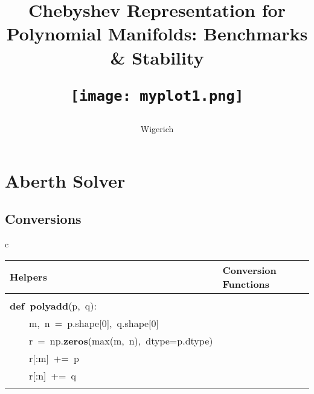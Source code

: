 \documentclass{article}\usepackage[]{graphicx}\usepackage[dvipsnames,table]{xcolor}
\title{
\vskip 5mm
{\bf\huge Chebyshev Representation}
\vskip 5mm
{\bf\huge for}
\vskip 5mm
{\bf\huge Polynomial Manifolds:}
\vskip 5mm
{\bf\huge Benchmarks \& Stability}
\vskip 1cm
\begin{center}
\texttt{[image: myplot1.png]}
\end{center}
\vskip 1cm
}
\author{Wigerich}
\makeatletter
\newcommand{\hlnum}[1]{\textcolor[rgb]{0.686,0.059,0.569}{#1}}%
\newcommand{\hlopt}[1]{\textcolor[rgb]{0,0,0}{#1}}%
\newcommand{\hldef}[1]{\textcolor[rgb]{0.345,0.345,0.345}{#1}}%
\newcommand{\hlkwa}[1]{\textcolor[rgb]{0.161,0.373,0.58}{\textbf{#1}}}%
\newcommand{\hlkwb}[1]{\textcolor[rgb]{0.69,0.353,0.396}{#1}}%
\newcommand{\hlkwd}[1]{\textcolor[rgb]{0.737,0.353,0.396}{\textbf{#1}}}%
\newenvironment{kframe}{%
 \def\at@end@of@kframe{}%
 \ifinner\ifhmode%
  \def\at@end@of@kframe{\end{minipage}}%
  \begin{minipage}{\columnwidth}%
 \fi\fi%
 \def\FrameCommand##1{\hskip\@totalleftmargin \hskip-\fboxsep
 \colorbox{shadecolor}{##1}\hskip-\fboxsep
     \hskip-\linewidth \hskip-\@totalleftmargin \hskip\columnwidth}%
 \MakeFramed {\advance\hsize-\width
   \@totalleftmargin\z@ \linewidth\hsize
   \@setminipage}}%
 {\par\unskip\endMakeFramed%
 \at@end@of@kframe}
\newenvironment{knitrout}{}{} %
\makeatother
\begin{document}
\maketitle

\newpage
\tableofcontents

\newpage
\section{Aberth Solver}
\subsection{Conversions}

\begin{center}
\begin{tabular}{c}
\begin{tabular}{m{10cm}m{10cm}}
\toprule
Helpers & Conversion Functions \\
\midrule
\begin{minipage}[m]{10cm}
\begin{knitrout}\tiny
\definecolor{shadecolor}{rgb}{0.969, 0.969, 0.969}\color{fgcolor}\begin{kframe}
\noindent
\ttfamily
\hldef{}\hlkwb{@njit}\hldef{}\hlopt{(}\hldef{fastmath}\hlopt{=}\hldef{}\hlkwa{True}\hldef{}\hlopt{)}\hspace*{\fill}\\
\hldef{}\hlkwa{def\ }\hldef{}\hlkwd{\textunderscore poly\textunderscore add}\hldef{}\hlopt{(}\hldef{p}\hlopt{,\ }\hldef{q}\hlopt{):}\hspace*{\fill}\\
\hldef{}\hldef{\ \ \ \ }\hldef{m}\hlopt{,\ }\hldef{n\ }\hlopt{=\ }\hldef{p}\hlopt{.}\hldef{shape}\hlopt{{[}}\hldef{}\hlnum{0}\hldef{}\hlopt{{]},\ }\hldef{q}\hlopt{.}\hldef{shape}\hlopt{{[}}\hldef{}\hlnum{0}\hldef{}\hlopt{{]}}\hspace*{\fill}\\
\hldef{}\hldef{\ \ \ \ }\hldef{r\ }\hlopt{=\ }\hldef{np}\hlopt{.}\hldef{}\hlkwd{zeros}\hldef{}\hlopt{(}\hldef{}\hlkwb{max}\hldef{}\hlopt{(}\hldef{m}\hlopt{,\ }\hldef{n}\hlopt{),\ }\hldef{dtype}\hlopt{=}\hldef{p}\hlopt{.}\hldef{dtype}\hlopt{)}\hspace*{\fill}\\
\hldef{}\hldef{\ \ \ \ }\hldef{r}\hlopt{{[}:}\hldef{m}\hlopt{{]}\ +=\ }\hldef{p}\hspace*{\fill}\\
\hldef{}\hldef{\ \ \ \ }\hldef{r}\hlopt{{[}:}\hldef{n}\hlopt{{]}\ +=\ }\hldef{q}\hspace*{\fill}\\

\end{kframe}
\end{knitrout}
\end{minipage}
\end{tabular}
\end{tabular}
\end{center}
\end{document}
